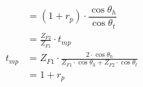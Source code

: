 \begin{align*}
                                      & = (1 + r_{p}) \cdot \dfrac{\cos \theta_h}{\cos \theta_t}                                                                                                                                                                    \\
                                      & = \frac{Z_{F2}}{Z_{F1}}\cdot t_{mp}                                                                                                                                                                                         \\
    t_{m p}                           & = Z_{F 1} \cdot \frac{2 \cdot \cos \theta_h}{Z_{F 1} \cdot \cos \theta_h+Z_{F 2} \cdot \cos \theta_t}                                                                                                                       \\
                                      & = 1+r_{p}                                                                                                                                                                                                                   \\
\end{align*}
